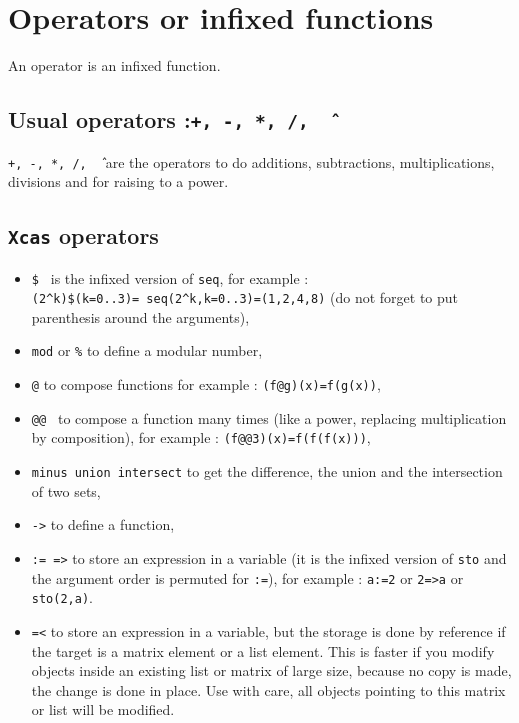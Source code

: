 \documentclass[a4paper,11pt]{book}
\begin{document}
\section{Operators or infixed functions}
An operator is an infixed function.

\subsection{Usual operators :{\tt +, -, *, /, \^\ }}\index{+}\index{-}\index{\^\ }
{\tt +, -, *, /, \^\ } are the operators to do
additions, subtractions, multiplications, divisions and for raising to a
power.

\subsection{{\tt Xcas} operators }\index{\@}\index{\@\@}\index{\$}\index{\%} 
\begin{itemize}
\item
{\tt \$ } is the infixed  version  of {\tt seq}, for example :\\
{\tt (2\verb|^|k)\$(k=0..3)= seq(2\verb|^|k,k=0..3)=(1,2,4,8)} (do not forget 
to put parenthesis around the arguments),
\item
{\tt mod} or {\tt \%} to define a modular number,
\item
{\tt @} to compose functions for example :
{\tt (f@g)(x)=f(g(x))},
\item
{\tt @@ } to compose a function many times (like a power, replacing
multiplication by composition), for example :
{\tt (f@@3)(x)=f(f(f(x)))},
\item
{\tt minus union intersect} to get the difference, the union and the 
intersection of two sets,
\item
{\tt ->} to define a function,
\item
{\tt := =>} to store an expression in a variable (it is the infixed 
version of {\tt sto} and the argument order is permuted for {\tt :=}), 
for example : {\tt a:=2} or {\tt 2=>a} or {\tt sto(2,a)}.
\item
{\tt =<} to store an expression in a variable, but the storage is
done by reference if the target is a matrix element or a list element.
This is faster if you modify objects inside an existing list or matrix
of large size, because no copy is made, the change is done in place.
Use with care, all objects pointing to this matrix or list will
be modified.
\end{itemize}
\end{document}

